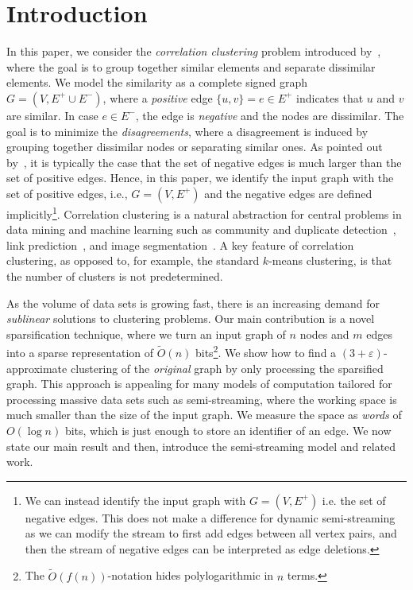 \documentclass{theoretics}
\newcommand{\eps}{\ensuremath{\varepsilon}}
\begin{document}
\section{Introduction}
In this paper, we consider the \emph{correlation clustering} problem introduced by~\cite{bansal2004correlation}, where the goal is to group together similar elements and separate dissimilar elements.
We model the similarity as a complete signed graph $G = (V, E^+ \cup E^-)$, where a \emph{positive} edge $\{ u, v \} = e \in E^+$ indicates that $u$ and $v$ are similar.
In case $e \in E^-$, the edge is \emph{negative} and the nodes are dissimilar. 
The goal is to minimize the \emph{disagreements}, where a disagreement is induced by grouping together dissimilar nodes or separating similar ones.
As pointed out by~\cite{chierichetti2014correlation}, it is typically the case that the set of negative edges is much larger than the set of positive edges.
Hence, in this paper, we identify the input graph with the set of positive edges, i.e., $G = (V, E^+)$ and the negative edges are defined implicitly\footnote{We  can instead identify the input graph with $G = (V, E^+)$ i.e. the set of negative edges. This does not make a difference for dynamic semi-streaming as we can modify the stream to first add edges between all vertex pairs, and then the stream of negative edges can be interpreted as edge deletions.}.
Correlation clustering is a natural abstraction for central problems in data mining and machine learning such as community and duplicate detection~\cite{Arasu2009, Chen2012}, link prediction~\cite{Yaroslavtsev2018}, and image segmentation~\cite{Kim2011}.
A key feature of correlation clustering, as opposed to, for example, the standard $k$-means clustering, is that the number of clusters is not predetermined.

As the volume of data sets is growing fast, there is an increasing demand for \emph{sublinear} solutions to  clustering problems.
Our main contribution is a novel sparsification technique, where we turn an input graph of $n$ nodes and $m$ edges into a sparse representation of $\widetilde{O}(n)$ bits\footnote{The $\widetilde{O}(f(n))$-notation hides polylogarithmic in $n$ terms.}.
We show how to find a $(3 + \eps)$-approximate clustering of the \emph{original} graph by only processing the sparsified graph.
This approach is appealing for many models of computation tailored for processing massive data sets such as semi-streaming, where the working space is much smaller than the size of the input graph.
We measure the space as \emph{words} of $O(\log n)$ bits, which is just enough to store an identifier of an edge.
We now state our main result and then, introduce the semi-streaming model and related work.
\end{document}
